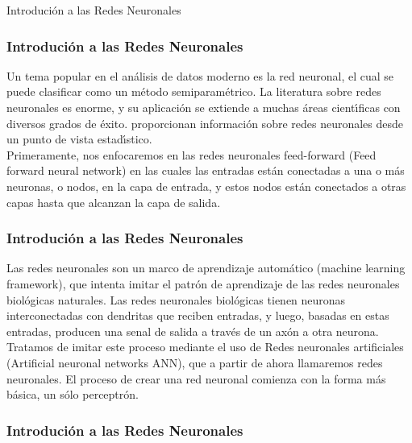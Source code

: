 \documentclass[spanish,xcolor=table]{beamer}
\begin{document}
\begin{section}{Introduci\'on a las Redes Neuronales}
\begin{frame}
\frametitle{Introduci\'on a las Redes Neuronales}

Un tema popular en el an\'alisis de datos moderno es la red neuronal, el cual se puede clasificar como un m\'etodo semiparam\'etrico. La literatura sobre redes neuronales es enorme, y su aplicaci\'on se extiende a muchas \'areas cient\'{\i}ficas con diversos grados de \'exito. \cite{cheng1994neural} proporcionan informaci\'on sobre redes neuronales desde un punto de vista estad\'{\i}stico. \\
Primeramente, nos enfocaremos en las redes neuronales feed-forward (Feed forward neural network) en las cuales las entradas est\'an conectadas a una o m\'as neuronas, o nodos, en la capa de entrada, y estos nodos est\'an conectados a otras capas hasta que alcanzan la capa de salida. 

\end{frame}
\begin{frame}
\frametitle{Introduci\'on a las Redes Neuronales}
Las redes neuronales son un marco de aprendizaje autom\'atico (machine learning framework), que intenta imitar el patr\'on de aprendizaje de las redes neuronales biol\'ogicas naturales. Las redes neuronales biol\'ogicas tienen neuronas interconectadas con dendritas que reciben entradas, y luego, basadas en estas entradas, producen una senal de salida a trav\'es de un ax\'on a otra neurona. Tratamos de imitar este proceso mediante el uso de Redes neuronales artificiales (Artificial neuronal networks ANN), que a partir de ahora llamaremos redes neuronales. El proceso de crear una red neuronal comienza con la forma m\'as b\'asica, un s\'olo perceptr\'on.
\end{frame}
\begin{frame}
\frametitle{Introduci\'on a las Redes Neuronales}


\end{frame}
\end{section}
\end{document}
